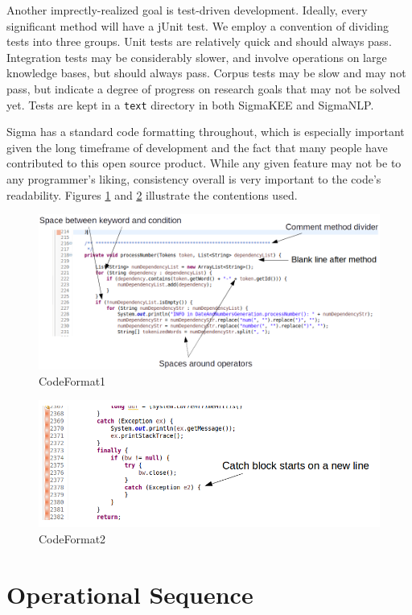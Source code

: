 \documentclass{book}
\begin{document}
Another imprectly-realized goal is test-driven development.  Ideally, every significant
method will have a jUnit test.  We employ a convention of dividing tests into
three groups.  Unit tests are relatively quick and should always pass.
Integration tests may be considerably slower, and involve operations on large knowledge
bases, but should always pass.  Corpus tests may be slow and may not pass, but indicate
a degree of progress on research goals that may not be solved yet.  Tests are
kept in a \texttt{text} directory in both SigmaKEE and SigmaNLP.

Sigma has a standard code formatting throughout, which is especially important
given the long timeframe of development and the fact that many people have
contributed to this open source product.  While any given feature may not be to
any programmer's liking, consistency overall is very important to the code's
readability.  Figures \ref{fig:CodeFormat1} and \ref{fig:CodeFormat2} illustrate
the contentions used.

\begin{figure}
  \centering
  \includegraphics[width=4.5in]{pictures/CodeFormat1.png}
  \caption{CodeFormat1}
  \label{fig:CodeFormat1}
\end{figure}

\begin{figure}
  \centering
  \includegraphics[width=4.5in]{pictures/CodeFormat2.png}
  \caption{CodeFormat2}
  \label{fig:CodeFormat2}
\end{figure}

\section{Operational Sequence}
\end{document}
